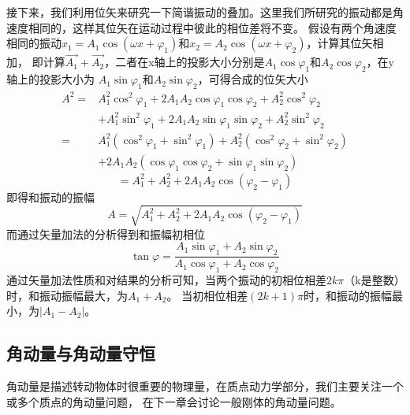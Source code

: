\documentclass{article}
\begin{document}
    接下来，我们利用位矢来研究一下简谐振动的叠加。这里我们所研究的振动都是角速度相同的，这样其位矢在运动过程中彼此的相位差将不变。
    假设有两个角速度相同的振动\(x_1 = A_1 \cos(\omega x +\varphi_1)\)和\(x_2 = A_2 \cos(\omega x + \varphi_2)\)，计算其位矢相加，
    即计算\(\vec{A_1}+\vec{A_2}\)，二者在x轴上的投影大小分别是\(A_1\cos\varphi_1\)和\(A_2\cos \varphi_2\)，在y轴上的投影大小为
    \(A_1\sin \varphi_1\)和\(A_2 \sin \varphi_2\)，可得合成的位矢大小
    \begin{align*}
        A^2 =& A_1^2\cos^2\varphi_1 + 2A_1A_2 \cos\varphi_1 \cos\varphi_2 + A_2^2 \cos^2 \varphi_2 \\
             & + A_1^2 \sin^2 \varphi_1 + 2A_1A_2 \sin\varphi_1\sin \varphi_2 + A_2^2 \sin^2 \varphi_2 \\
            =& A_1^2(\cos^2\varphi_1 + \sin^2\varphi_1) + A_2^2(\cos^2\varphi_2 + \sin^2\varphi_2) \\
             & + 2A_1A_2(\cos\varphi_1 \cos\varphi_2 + \sin\varphi_1 \sin\varphi_2)
    \end{align*}
    \begin{equation*}
        =A_1^2 + A_2^2 + 2A_1A_2 \cos(\varphi_2 - \varphi_1)
    \end{equation*}
    即得和振动的振幅
    \begin{equation*}
        A = \sqrt{A_1^2 + A_2^2 + 2A_1A_2 \cos(\varphi_2 - \varphi_1)}
    \end{equation*}
    而通过矢量加法的分析得到和振幅初相位
    \begin{equation*}
        \tan \varphi = \frac{A_1 \sin\varphi_1 + A_2 \sin\varphi_2}{A_1 \cos\varphi_1 + A_2\cos\varphi_2}
    \end{equation*}
    通过矢量加法性质和对结果的分析可知，当两个振动的初相位相差\(2k\pi\)（k是整数）时，和振动振幅最大，为\(A_1 + A_2\)。
    当初相位相差\((2k+1)\pi\)时，和振动的振幅最小，为\(|A_1 - A_2|\)。


    \subsection{角动量与角动量守恒}
    角动量是描述转动物体时很重要的物理量，在质点动力学部分，我们主要关注一个或多个质点的角动量问题，
    在下一章会讨论一般刚体的角动量问题。
\end{document}
